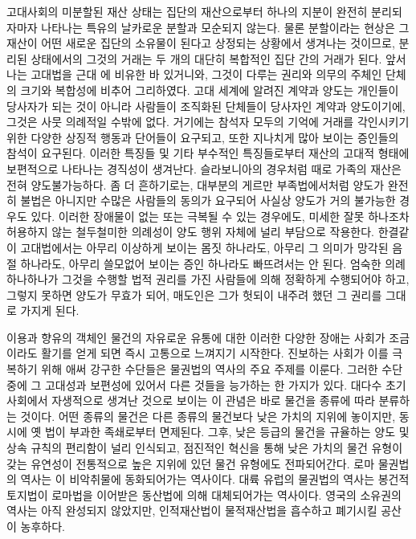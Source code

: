 고대사회의 미분할된 재산 상태는
집단의 재산으로부터 하나의 지분이 완전히 분리되자마자 나타나는
특유의 날카로운 분할과 모순되지 않는다.
물론 분할이라는 현상은
그 재산이 어떤 새로운 집단의 소유물이 된다고 상정되는 상황에서
생겨나는 것이므로,
분리된 상태에서의 그것의 거래는
두 개의 대단히 복합적인 집단 간의 거래가 된다.
앞서 나는 고대법을 근대 에 비유한 바 있거니와,
그것이 다루는 권리와 의무의 주체인 단체의 크기와 복합성에 비추어 그리하였다.
고대 세계에 알려진 계약과 양도는
개인들이 당사자가 되는 것이 아니라
사람들이 조직화된 단체들이 당사자인 계약과 양도이기에,
그것은 사뭇 의례적일 수밖에 없다.
거기에는
참석자 모두의 기억에 거래를 각인시키기 위한
다양한 상징적 행동과 단어들이 요구되고,
또한 지나치게 많아 보이는 증인들의 참석이 요구된다.
이러한 특징들 및 기타 부수적인 특징들로부터
재산의 고대적 형태에 보편적으로 나타나는 경직성이 생겨난다.
슬라보니아의 경우처럼
때로 가족의 재산은 전혀 양도불가능하다.
좀 더 흔하기로는,
대부분의 게르만 부족법에서처럼
양도가 완전히 불법은 아니지만
수많은 사람들의 동의가 요구되어
사실상 양도가 거의 불가능한 경우도 있다.
이러한 장애물이 없는
또는 극복될 수 있는 경우에도,
미세한 잘못 하나조차 허용하지 않는 철두철미한 의례성이
양도 행위 자체에 널리 부담으로 작용한다.
한결같이
고대법에서는
아무리 이상하게 보이는 몸짓 하나라도,
아무리 그 의미가 망각된 음절 하나라도,
아무리 쓸모없어 보이는 증인 하나라도
빠뜨려서는 안 된다.
엄숙한 의례 하나하나가
그것을 수행할 법적 권리를 가진 사람들에 의해
정확하게 수행되어야 하고,
그렇지 못하면
양도가 무효가 되어,
매도인은 그가 헛되이 내주려 했던 그 권리를 그대로 가지게 된다.

이용과 향유의 객체인 물건의 자유로운 유통에 대한 이러한 다양한 장애는
사회가 조금이라도 활기를 얻게 되면 즉시
고통으로 느껴지기 시작한다.
진보하는 사회가 이를 극복하기 위해 애써 강구한 수단들은
물권법의 역사의 주요 주제를 이룬다.
그러한 수단 중에
그 고대성과 보편성에 있어서 다른 것들을 능가하는 한 가지가 있다.
대다수 초기 사회에서 자생적으로 생겨난 것으로 보이는 이 관념은
바로 물건을 종류에 따라 분류하는 것이다.
어떤 종류의 물건은 다른 종류의 물건보다 낮은 가치의 지위에 놓이지만,
동시에 옛 법이 부과한 족쇄로부터 면제된다.
그후,
낮은 등급의 물건을 규율하는 양도 및 상속 규칙의 편리함이
널리 인식되고,
점진적인 혁신을 통해 낮은 가치의 물건 유형이 갖는 유연성이
전통적으로 높은 지위에 있던 물건 유형에도 전파되어간다.
로마 물권법의 역사는 이
비악취물에 동화되어가는
역사이다.
대륙 유럽의 물권법의 역사는
봉건적 토지법이 로마법을 이어받은 동산법에 의해
대체되어가는 역사이다.
영국의 소유권의 역사는 아직 완성되지 않았지만,
인적재산법이
물적재산법을
흡수하고 폐기시킬 공산이
농후하다.

